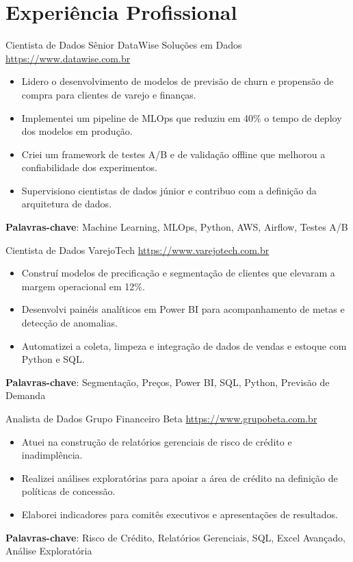 \documentclass[a4paper, serif, 10pt]{moderncv}
\begin{document}
\section{Experiência Profissional}

        {Cientista de Dados Sênior}
        {DataWise Soluções em Dados}
        {\url{https://www.datawise.com.br}}
        {}
        {\begin{itemize}
\item Lidero o desenvolvimento de modelos de previsão de churn e propensão de compra para clientes de varejo e finanças.
\item Implementei um pipeline de MLOps que reduziu em 40\% o tempo de deploy dos modelos em produção.
\item Criei um framework de testes A/B e de validação offline que melhorou a confiabilidade dos experimentos.
\item Supervisiono cientistas de dados júnior e contribuo com a definição da arquitetura de dados.
\end{itemize}
\textbf{Palavras-chave}: Machine Learning, MLOps, Python, AWS, Airflow, Testes A/B}

        {Cientista de Dados}
        {VarejoTech}
        {\url{https://www.varejotech.com.br}}
        {}
        {\begin{itemize}
\item Construí modelos de precificação e segmentação de clientes que elevaram a margem operacional em 12\%.
\item Desenvolvi painéis analíticos em Power BI para acompanhamento de metas e detecção de anomalias.
\item Automatizei a coleta, limpeza e integração de dados de vendas e estoque com Python e SQL.
\end{itemize}
\textbf{Palavras-chave}: Segmentação, Preços, Power BI, SQL, Python, Previsão de Demanda}

        {Analista de Dados}
        {Grupo Financeiro Beta}
        {\url{https://www.grupobeta.com.br}}
        {}
        {\begin{itemize}
\item Atuei na construção de relatórios gerenciais de risco de crédito e inadimplência.
\item Realizei análises exploratórias para apoiar a área de crédito na definição de políticas de concessão.
\item Elaborei indicadores para comitês executivos e apresentações de resultados.
\end{itemize}
\textbf{Palavras-chave}: Risco de Crédito, Relatórios Gerenciais, SQL, Excel Avançado, Análise Exploratória}
\end{document}
